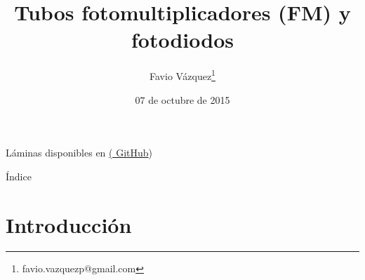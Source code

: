 \documentclass[a4paper,10pt]{beamer}
\begin{document}
\begin{frame}
\Large
\title{Tubos fotomultiplicadores (FM) y fotodiodos}
\author{Favio Vázquez\footnote{favio.vazquezp@gmail.com}}
\date{$07$ de octubre de 2015}


Láminas disponibles en \href{https://github.com/FavioVazquez/DeteccionRayosCosmicos-PCF}{(\color{blue} GitHub})

\maketitle
\end{frame}

\begin{frame}[allowframebreaks]{Índice}

\tableofcontents

\end{frame}

\section{Introducción}
\end{document}
